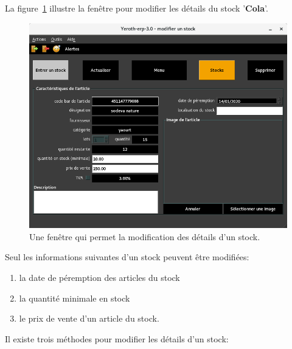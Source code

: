 {}

La figure~\ref{fig:yeren-fenetre-modifier-stock}
illustre la fen\^etre pour modifier les d\'etails
du stock '\textbf{Cola}'.\\

\begin{figure}[!htbp]
	\centering
	\includegraphics[scale=0.63]{images/yeren-fenetre-modifier-stock.png}
	\caption{Une fen\^etre qui permet la modification des d\'etails d'un stock.}
	\label{fig:yeren-fenetre-modifier-stock}
\end{figure}

Seul les informations suivantes d'un stock peuvent
\^etre modifi\'ees:
\begin{enumerate}[1)]
	\item la date de p\'eremption des articles du stock
	\item la quantit\'e minimale en stock
	\item le prix de vente d'un article du stock.\\
\end{enumerate}

Il existe trois m\'ethodes pour modifier les d\'etails
d'un stock:


